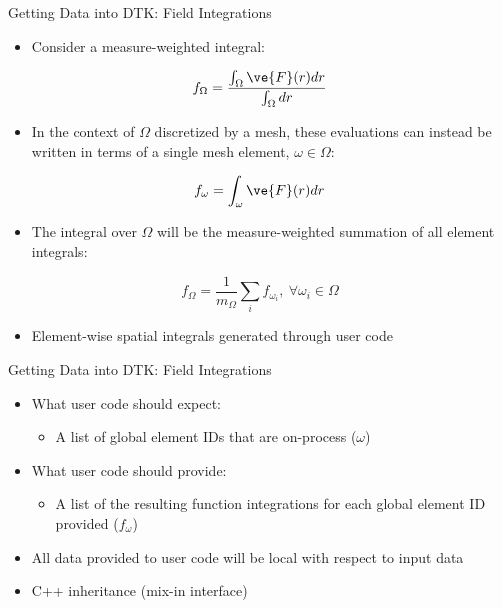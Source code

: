 \documentclass{beamer}
\begin{document}
\begin{frame}{Getting Data into DTK: Field Integrations}

  \begin{itemize}
  \item Consider a measure-weighted integral:
  \end{itemize}

  \[
  f_{\Omega} = \frac{\int_{\Omega} \ve{F}(r) dr}{\int_{\Omega} dr}
  \]

  \begin{itemize}
  \item In the context of $\Omega$ discretized by a mesh, these
    evaluations can instead be written in terms of a single mesh
    element, $\omega \in \Omega$:
  \end{itemize}

  \[
  f_{\omega} = \int_{\omega} \ve{F}(r) dr
  \]

  \begin{itemize}
  \item The integral over $\Omega$ will be the measure-weighted
    summation of all element integrals:
  \end{itemize}

  \[
    f_{\Omega} = \frac{1}{m_{\Omega}} \sum_i f_{{\omega}_i},\ \forall
    \omega_i \in \Omega
  \]

  \begin{itemize}
  \item Element-wise spatial integrals generated through user code
  \end{itemize}
\end{frame}

\begin{frame}{Getting Data into DTK: Field Integrations}

  \begin{itemize}
    \item What user code should expect:
      \medskip
      \begin{itemize}
      \item A list of global element IDs that are on-process ($\omega$)
      \end{itemize}
      \medskip
    \item What user code should provide:
      \medskip
      \begin{itemize}
      \item A list of the resulting function integrations for each
        global element ID provided ($f_{\omega}$)
      \end{itemize}
    \item All data provided to user code will be local with respect to
      input data
    \item C++ inheritance (mix-in interface)
  \end{itemize}

\end{frame}
\end{document}
